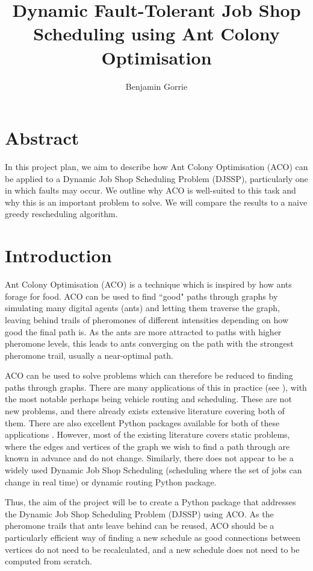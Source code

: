 \documentclass[final-report]{report-template}
\title{Dynamic Fault-Tolerant Job Shop Scheduling using Ant Colony Optimisation}
\author{Benjamin Gorrie}
\begin{document}
\maketitlepage  %

\section*{Abstract}
In this project plan, we aim to describe how Ant Colony Optimisation (ACO) can be applied to a Dynamic Job Shop Scheduling Problem (DJSSP), particularly one in which faults may occur. We outline why ACO is well-suited to this task and why this is an important problem to solve. We will compare the results to a naive greedy rescheduling algorithm.

\tableofcontents

\section{Introduction}
Ant Colony Optimisation (ACO) is a technique which is inspired by how ants forage for food. ACO can be used to find ``good" paths through graphs by simulating many digital agents (ants) and letting them traverse the graph, leaving behind trails of pheromones of different intensities depending on how good the final path is. As the ants are more attracted to paths with higher pheromone levels, this leads to ants converging on the path with the strongest pheromone trail, usually a near-optimal path.

ACO can be used to solve problems which can therefore be reduced to finding paths through graphs. There are many applications of this in practice (see \cite{enwiki:1292514538}), with the most notable perhaps being vehicle routing and scheduling. These are not new problems, and there already exists extensive literature covering both of them. There are also excellent Python packages available for both of these applications \cite{Wouda_Lan_Kool_PyVRP_2024} \cite{jobshoplib}. However, most of the existing literature covers static problems, where the edges and vertices of the graph we wish to find a path through are known in advance and do not change. Similarly, there does not appear to be a widely used Dynamic Job Shop Scheduling (scheduling where the set of jobs can change in real time) or dynamic routing Python package. 

Thus, the aim of the project will be to create a Python package that addresses the Dynamic Job Shop Scheduling Problem (DJSSP) using ACO. As the pheromone trails that ants leave behind can be reused, ACO should be a particularly efficient way of finding a new schedule as good connections between vertices do not need to be recalculated, and a new schedule does not need to be computed from scratch. 
\end{document}
